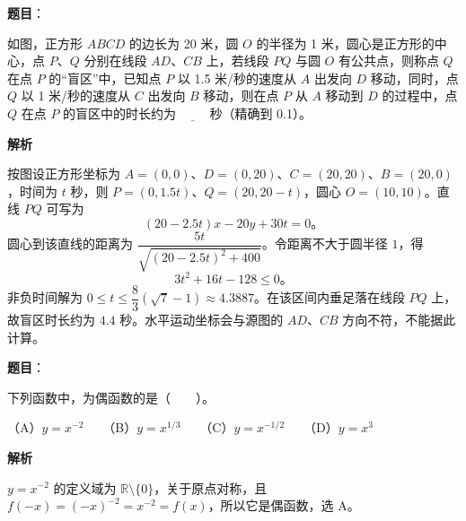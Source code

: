 \begin{answer}

\textbf{题目}：

如图，正方形 $ABCD$ 的边长为 20 米，圆 $O$ 的半径为 1 米，圆心是正方形的中心，点 $P\text{、}Q$ 分别在线段 $AD\text{、}CB$ 上，若线段 $PQ$ 与圆 $O$ 有公共点，则称点 $Q$ 在点 $P$ 的“盲区”中，已知点 $P$ 以 1.5 米/秒的速度从 $A$ 出发向 $D$ 移动，同时，点 $Q$ 以 1 米/秒的速度从 $C$ 出发向 $B$ 移动，则在点 $P$ 从 $A$ 移动到 $D$ 的过程中，点 $Q$ 在点 $P$ 的盲区中的时长约为 $\underline{\qquad}$ 秒（精确到 0.1）。
\nopagebreak[4]
\begin{center}\end{center}
\nopagebreak[4]
\textbf{解析}
\nopagebreak[4]
\begin{center}\end{center}
\nopagebreak[4]
按图设正方形坐标为 $A=(0,0)$、$D=(0,20)$、$C=(20,20)$、$B=(20,0)$，时间为 $t$ 秒，则 $P=(0,1.5t)$、$Q=(20,20-t)$，圆心 $O=(10,10)$。直线 $PQ$ 可写为
\nopagebreak[4]
\[
(20-2.5t)x-20y+30t=0\mbox{。}
\]
圆心到该直线的距离为 $\dfrac{5t}{\sqrt{(20-2.5t)^2+400}}$。令距离不大于圆半径 $1$，得
\nopagebreak[4]
\[
3t^2+16t-128\leq0\mbox{。}
\]
非负时间解为 $0\leq t\leq\dfrac83(\sqrt7-1)\approx4.3887$。在该区间内垂足落在线段 $PQ$ 上，故盲区时长约为 $4.4$ 秒。水平运动坐标会与源图的 $AD$、$CB$ 方向不符，不能据此计算。


\end{answer}
\begin{answer}

\textbf{题目}：

下列函数中，为偶函数的是\mbox{（　　）}。

（A）$y=x^{-2}$　　（B）$y=x^{1/3}$　　（C）$y=x^{-1/2}$　　（D）$y=x^3$

\textbf{解析}

$y=x^{-2}$ 的定义域为 $\mathbb R\setminus\{0\}$，关于原点对称，且 $f(-x)=(-x)^{-2}=x^{-2}=f(x)$，所以它是偶函数，选 A。


\end{answer}
